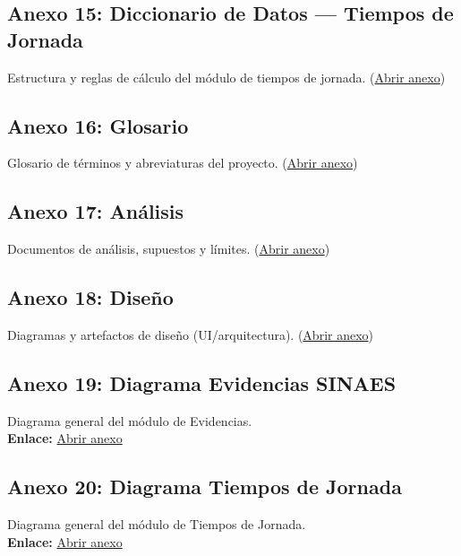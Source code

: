 \subsection*{Anexo 15: Diccionario de Datos — Tiempos de Jornada}
\label{anexo:dicc_jornada}
\parbox{\linewidth}{%
Estructura y reglas de cálculo del módulo de tiempos de jornada.
(\href{https://drive.google.com/file/d/1hmq_H_os67XBwliWEogt59qXKPFq964F/view?usp=drive_link}{Abrir anexo})
}

\subsection*{Anexo 16: Glosario}
\label{anexo:glosario}
\parbox{\linewidth}{%
Glosario de términos y abreviaturas del proyecto.
(\href{https://drive.google.com/file/d/18UFM7d1duhJpcXTDCmMAK4PnTFuqFT9k/view?usp=sharing}{Abrir anexo})
}

\subsection*{Anexo 17: Análisis}
\label{anexo:analisis}
\parbox{\linewidth}{%
Documentos de análisis, supuestos y límites.
(\href{https://drive.google.com/file/d/1S_cPKigSkLcA06b0DwnT0mBnKnIiOwZz/view?usp=sharing}{Abrir anexo})
}

\subsection*{Anexo 18: Diseño}
\label{anexo:diseno}
\parbox{\linewidth}{%
Diagramas y artefactos de diseño (UI/arquitectura).
(\href{https://drive.google.com/file/d/1fP3GDwJTx6le_CSUnIHpsyVAWys5i6Xe/view?usp=sharing}{Abrir anexo})
}

\subsection*{Anexo 19: Diagrama Evidencias SINAES}
Diagrama general del módulo de Evidencias.\\[2pt]
\textbf{Enlace:} \href{https://drive.google.com/file/d/1JOyRg4BCDVRNGavIcEJBhe_vZfon9DQJ/view?usp=sharing}{Abrir anexo}

\subsection*{Anexo 20: Diagrama Tiempos de Jornada}
Diagrama general del módulo de Tiempos de Jornada.\\[2pt]
\textbf{Enlace:} \href{https://drive.google.com/file/d/1e3sLb27zRPAvATex8cs8AFXy211b11QI/view?usp=sharing}{Abrir anexo}

